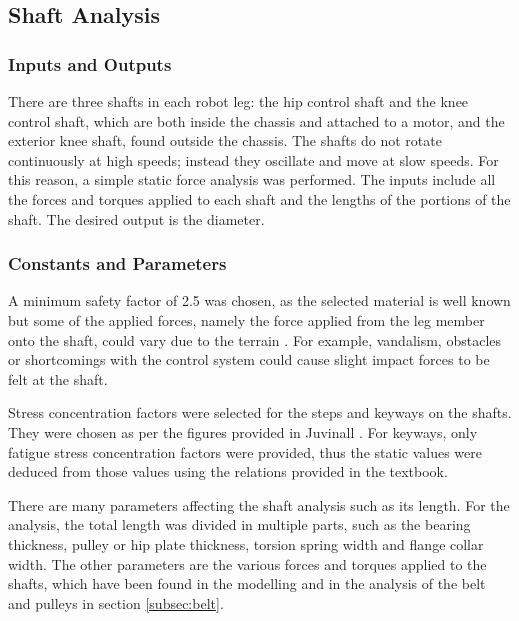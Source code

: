\subsection{Shaft Analysis} 
\label{subsec:shaft}

\subsubsection{Inputs and Outputs}
There are three shafts in each robot leg: the hip control shaft and the knee control shaft, which are both inside the chassis and attached to a motor, and the exterior knee shaft, found outside the chassis. The shafts do not rotate continuously at high speeds; instead they oscillate and move at slow speeds. For this reason, a simple static force analysis was performed. The inputs include all the forces and torques applied to each shaft and the lengths of the portions of the shaft. The desired output is the diameter.

\subsubsection{Constants and Parameters}

A minimum safety factor of 2.5 was chosen, as the selected material is well known but some of the applied forces, namely the force applied from the leg member onto the shaft, could vary due to the terrain \cite{juvinall_fundamentals_2012}. For example, vandalism, obstacles or shortcomings with the control system could cause slight impact forces to be felt at the shaft. 

Stress concentration factors were selected for the steps and keyways on the shafts. They were chosen as per the figures provided in Juvinall \cite{juvinall_fundamentals_2012}. For keyways, only fatigue stress concentration factors were provided, thus the static values were deduced from those values using the relations provided in the textbook.

There are many parameters affecting the shaft analysis such as its length. For the analysis, the total length was divided in multiple parts, such as the bearing thickness, pulley or hip plate thickness, torsion spring width and flange collar width. The other parameters are the various forces and torques applied to the shafts, which have been found in the modelling and in the analysis of the belt and pulleys in section \ref{subsec:belt}.


